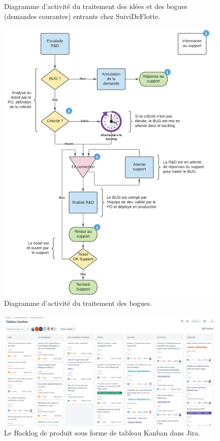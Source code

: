 \begin{appendices}
\begin{figure}[ht]
        \caption{Diagramme d'activité du traitement des idées et des bogues (demandes courantes) entrants chez SuiviDeFlotte.}
        \label{fig:lifecycle-of-incoming-ideas}
    \end{figure}

    \begin{figure}[ht]
        \centering
        \includegraphics[width=\textwidth]{img/lifecycle-of-bugs}
        \caption{Diagramme d'activité du traitement des bogues.}
        \label{fig:lifecycle-of-bugs}
    \end{figure}

    \begin{figure}[ht]
        \centering
        \includegraphics[width=\textwidth]{img/product-backlog}
        \caption{Le Backlog de produit sous forme de tableau Kanban dans Jira.}
        \label{fig:product-backlog}
    \end{figure}


\end{appendices}
